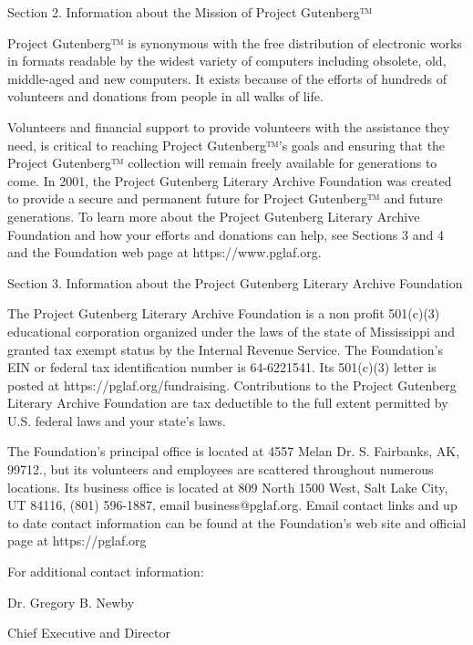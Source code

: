 {\begin{center}
Section 2. Information about the Mission of Project Gutenberg™
\end{center}

Project Gutenberg™ is synonymous with the free distribution of
electronic works in formats readable by the widest variety of computers
including obsolete, old, middle-aged and new computers. It exists
because of the efforts of hundreds of volunteers and donations from
people in all walks of life.

Volunteers and financial support to provide volunteers with the
assistance they need, is critical to reaching Project Gutenberg™'s
goals and ensuring that the Project Gutenberg™ collection will
remain freely available for generations to come. In 2001, the Project
Gutenberg Literary Archive Foundation was created to provide a secure
and permanent future for Project Gutenberg™ and future generations.
To learn more about the Project Gutenberg Literary Archive Foundation
and how your efforts and donations can help, see Sections 3 and 4
and the Foundation web page at https://www.pglaf.org.

\begin{center}
Section 3. Information about the Project Gutenberg Literary Archive
Foundation
\end{center}

The Project Gutenberg Literary Archive Foundation is a non profit
501(c)(3) educational corporation organized under the laws of the
state of Mississippi and granted tax exempt status by the Internal
Revenue Service. The Foundation's EIN or federal tax identification
number is 64-6221541. Its 501(c)(3) letter is posted at
https://pglaf.org/fundraising. Contributions to the Project Gutenberg
Literary Archive Foundation are tax deductible to the full extent
permitted by U.S. federal laws and your state's laws.

The Foundation's principal office is located at 4557 Melan Dr. S.
Fairbanks, AK, 99712., but its volunteers and employees are scattered
throughout numerous locations. Its business office is located at
809 North 1500 West, Salt Lake City, UT 84116, (801) 596-1887, email
business@pglaf.org. Email contact links and up to date contact
information can be found at the Foundation's web site and official
page at https://pglaf.org

For additional contact information:

   \quad\quad Dr. Gregory B. Newby
   
   \quad\quad Chief Executive and Director
   
}
